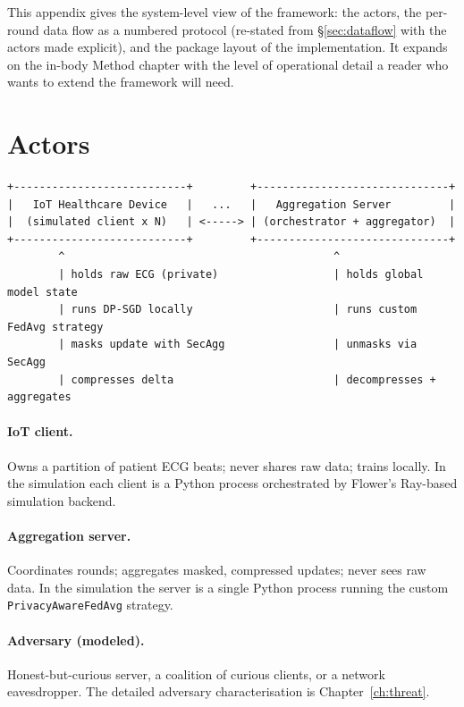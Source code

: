 \documentclass[11pt,a4paper]{report}
\begin{document}
This appendix gives the system-level view of the framework: the actors,
the per-round data flow as a numbered protocol (re-stated from
\S\ref{sec:dataflow} with the actors made explicit), and the package
layout of the implementation. It expands on the in-body Method chapter
with the level of operational detail a reader who wants to extend the
framework will need.

\section{Actors}

\begin{verbatim}
+---------------------------+         +------------------------------+
|   IoT Healthcare Device   |   ...   |   Aggregation Server         |
|  (simulated client x N)   | <-----> | (orchestrator + aggregator)  |
+---------------------------+         +------------------------------+
        ^                                          ^
        | holds raw ECG (private)                  | holds global model state
        | runs DP-SGD locally                      | runs custom FedAvg strategy
        | masks update with SecAgg                 | unmasks via SecAgg
        | compresses delta                         | decompresses + aggregates
\end{verbatim}

\paragraph{IoT client.} Owns a partition of patient ECG beats; never
shares raw data; trains locally. In the simulation each client is a
Python process orchestrated by Flower's Ray-based simulation backend.

\paragraph{Aggregation server.} Coordinates rounds; aggregates masked,
compressed updates; never sees raw data. In the simulation the server
is a single Python process running the custom \texttt{PrivacyAwareFedAvg}
strategy.

\paragraph{Adversary (modeled).} Honest-but-curious server, a coalition
of curious clients, or a network eavesdropper. The detailed adversary
characterisation is Chapter~\ref{ch:threat}.
\end{document}
